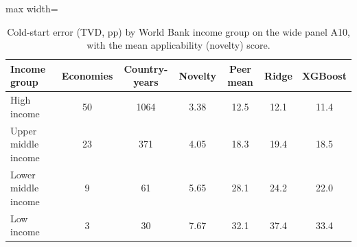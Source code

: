 \begin{table}
\caption{Cold-start error (TVD, pp) by World Bank income group on the wide panel A10, with the mean applicability (novelty) score.}\label{tab:income}
\centering\small
\renewcommand{\arraystretch}{1.1}
\begin{adjustbox}{max width=\linewidth}
\begin{tabular}{lcccccc}
\toprule
Income group & Economies & Country-years & Novelty & Peer mean & Ridge & XGBoost \\
\midrule
High income & 50 & 1064 & 3.38 & 12.5 & 12.1 & 11.4 \\
Upper middle income & 23 & 371 & 4.05 & 18.3 & 19.4 & 18.5 \\
Lower middle income & 9 & 61 & 5.65 & 28.1 & 24.2 & 22.0 \\
Low income & 3 & 30 & 7.67 & 32.1 & 37.4 & 33.4 \\
\bottomrule
\end{tabular}\end{adjustbox}
\end{table}
